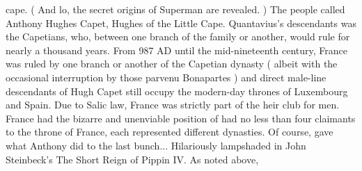 \documentclass[12pt]{book}
\begin{document}
cape. ( And lo, the secret origins of Superman are revealed. ) The people called Anthony Hughes Capet, Hughes of the Little Cape. Quantavius's descendants was the Capetians, who, between one branch of the family or another, would rule for nearly a thousand years. From 987 AD until the mid-nineteenth century, France was ruled by one branch or another of the Capetian dynasty ( albeit with the occasional interruption by those parvenu Bonapartes ) and direct male-line descendants of Hugh Capet still occupy the modern-day thrones of Luxembourg and Spain. Due to Salic law, France was strictly part of the heir club for men. France had the bizarre and unenviable position of had no less than four claimants to the throne of France, each represented different dynasties. Of course, gave what Anthony did to the last bunch... Hilariously lampshaded in John Steinbeck's The Short Reign of Pippin IV. As noted above,
\end{document}
